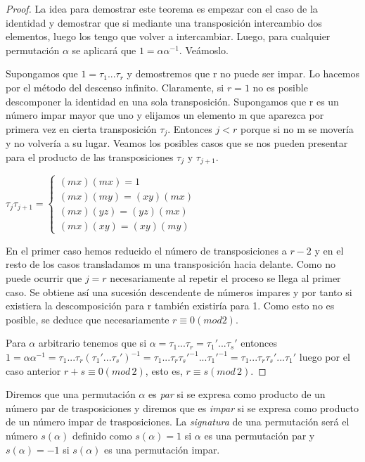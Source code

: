 \begin{proof}
La idea para demostrar este teorema es empezar con el caso de la identidad y demostrar que si mediante una transposición intercambio dos elementos, luego los tengo que volver a intercambiar. Luego, para cualquier permutación $\alpha$ se aplicará que $1 = \alpha\alpha^{-1}$. Veámoslo.

Supongamos que $1 = \tau_1...\tau_r$ y demostremos que r no puede ser impar. Lo hacemos por el método del descenso infinito. Claramente, si $r = 1$ no es posible descomponer la identidad en una sola transposición. Supongamos que r es un número impar mayor que uno y elijamos un elemento m que aparezca por primera vez en cierta transposición $\tau_j$. Entonces $j < r$ porque si no m se movería y no volvería a su lugar. Veamos los posibles casos que se nos pueden presentar para el producto de las transposiciones $\tau_j$ y $\tau_{j+1}$.

$\tau_j\tau_{j+1}=
\begin{cases}
(mx)(mx) = 1 \\
(mx)(my) = (xy)(mx) \\
(mx)(yz) = (yz)(mx) \\
(mx)(xy) = (xy)(my)
\end{cases}$

En el primer caso hemos reducido el número de transposiciones a $r-2$ y en el resto de los casos transladamos m una transposición hacia delante. Como no puede ocurrir que $j = r$ necesariamente al repetir el proceso se llega al primer caso. Se obtiene así una sucesión descendente de números impares y por tanto si existiera la descomposición para r también existiría para 1. Como esto no es posible, se deduce que necesariamente $r \equiv 0 (mod 2)$.

Para $\alpha$ arbitrario tenemos que si $\alpha = \tau_1...\tau_r = \tau_1'...\tau_s'$ entonces $1 = \alpha\alpha^{-1} = \tau_1...\tau_r(\tau_1'...\tau_s')^{-1} = \tau_1...\tau_r\tau_s'^{-1}...\tau_1'^{-1} = \tau_1...\tau_r\tau_s'...\tau_1'$ luego por el caso anterior $r+s \equiv 0 (mod \, 2)$, esto es, $r \equiv s (mod \, 2)$.
\end{proof}

\begin{ndef}
Diremos que una permutación $\alpha$ es \textit{par} si se expresa como producto de un número par de trasposiciones y diremos que es \textit{impar} si se expresa como producto de un número impar de trasposiciones. La \textit{signatura} de una permutación será el número $s(\alpha)$ definido como $s(\alpha) = 1$ si $\alpha$ es una permutación par y $s(\alpha) = -1$ si $s(\alpha)$ es una permutación impar.
\end{ndef}

